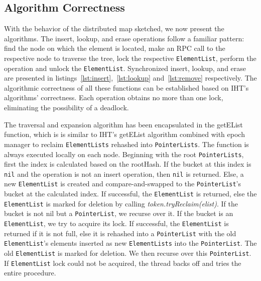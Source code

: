 \documentclass[letterpaper, 10 pt, conference]{ieeeconf}  %
\begin{document}
\subsection{Algorithm Correctness}
With the behavior of the distributed map sketched, we now present the algorithms. The insert, lookup, and erase operations follow a familiar pattern: find the node on which the element is located, make an RPC call to the respective node to traverse the tree, lock the respective \texttt{ElementList}, perform the operation and unlock the \texttt{ElementList}. Synchronized insert, lookup, and erase are presented in listings~\ref{lst:insert},~\ref{lst:lookup} and~\ref{lst:remove} respectively. The algorithmic correctness of all these functions can be established based on IHT's algorithms' correctness. Each operation obtains no more than one lock, eliminating the possibility of a deadlock.

The traversal and expansion algorithm has been encapsulated in the getEList function, which is is similar to IHT's getEList algorithm combined with epoch manager to reclaim \texttt{ElementLists} rehashed into \texttt{PointerLists}. The function is always executed locally on each node. Beginning with the root \texttt{PointerLists}, first the index is calculated based on the rootHash. If the bucket at this index is \texttt{nil} and the operation is not an insert operation, then \texttt{nil} is returned. Else, a new \texttt{ElementList} is created and compare-and-swapped to the \texttt{PointerList}'s bucket at the calculated index. If successful, the \texttt{ElementList} is returned, else the \texttt{ElementList} is marked for deletion by calling \textit{token.tryReclaim(elist)}. If the bucket is not nil but a \texttt{PointerList}, we recurse over it. If the bucket is an \texttt{ElementList}, we try to acquire its lock. If successful, the \texttt{ElementList} is returned if it is not full, else it is rehashed into a \texttt{PointerList} with the old \texttt{ElementList}'s elements inserted as new \texttt{ElementLists} into the \texttt{PointerList}. The old \texttt{ElementList} is marked for deletion. We then recurse over this \texttt{PointerList}. If \texttt{ElementList} lock could not be acquired, the thread backs off and tries the entire procedure.
\end{document}

